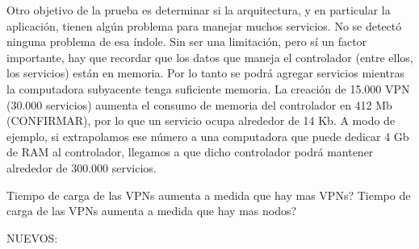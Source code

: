 Otro objetivo de la prueba es determinar si la arquitectura, y en particular la aplicación, tienen algún problema para manejar muchos servicios. No se detectó ninguna problema de esa índole. Sin ser una limitación, pero sí un factor importante, hay que recordar que los datos que maneja el controlador (entre ellos, los servicios) están en memoria. Por lo tanto se podrá agregar servicios mientras la computadora subyacente tenga suficiente memoria. La creación de 15.000 VPN (30.000 servicios) aumenta el consumo de memoria del controlador en 412 Mb (CONFIRMAR), por lo que un servicio ocupa alrededor de 14 Kb. A modo de ejemplo, si extrapolamos ese número a una computadora que puede dedicar 4 Gb de RAM al controlador, llegamos a que dicho controlador podrá mantener alrededor de 300.000 servicios.





Tiempo de carga de las VPNs aumenta a medida que hay mas VPNs?
Tiempo de carga de las VPNs aumenta a medida que hay mas nodos?

NUEVOS:

